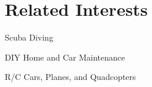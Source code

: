 \documentclass[letterpaper]{resume} %
\begin{document}
\begin{minipage}[t]{0.33\textwidth}

\section{Related Interests}
\sectionspace %
\begin{tightitemize}
\item Scuba Diving
\item DIY Home and Car Maintenance
\item R/C Cars, Planes, and Quadcopters
\end{tightitemize}


\end{minipage} %
\hfill
%
%
\end{document}
